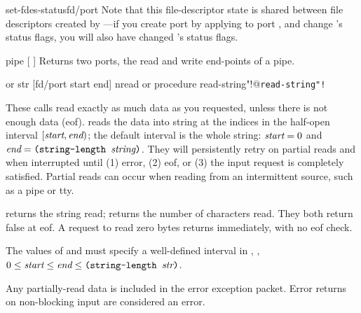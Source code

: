 \begin{defundescx}{set-fdes-status}{fd/port \integer}{\undefined}
Note that this file-descriptor state is shared between file descriptors
created by ---if you create port  by applying 
to port , and change {}'s status flags, you will also have
changed {}'s status flags.
\end{defundescx}

\begin{defundesc}{pipe}{} {[ ]}
Returns two ports, the read and write end-points of a {\Unix} pipe.
\end{defundesc}

 {{\str} or \sharpf}
 {str [fd/port start end]} {nread or \sharpf}{procedure}
        {read-string"!@\texttt{read-string"!}}
\begin{desc}
  These calls read exactly as much data as you requested, unless
  there is not enough data (eof). 
   reads the data into string 
  at the indices in the half-open interval $[\var{start},\var{end})$;
  the default interval is the whole string: $\var{start}=0$ and
  $\var{end}=\ex{(string-length \var{string})}$.
  They will persistently retry on partial reads and when interrupted
  until (1) error, (2) eof, or (3) the input request is completely
  satisfied.
  Partial reads can occur when reading from an intermittent source,
  such as a pipe or tty.

   returns the string read;  returns
  the number of characters read. They both return false at eof.
  A request to read zero bytes returns immediately, with no eof check.

  The values of  and  must specify a well-defined
  interval in , 
  \ie, $0 \le \var{start} \le \var{end} \le \ex{(string-length \var{str})}$.

  Any partially-read data is included in the error exception packet.
  Error returns on non-blocking input are considered an error.
\end{desc}

